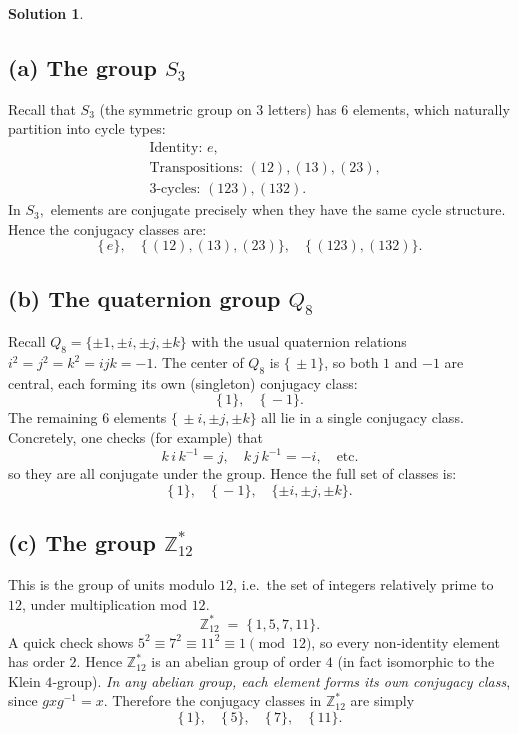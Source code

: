 \documentclass[12pt]{article}
\theoremstyle{definition} %
\newtheorem{solution}{Solution}
\theoremstyle{plain} %
\begin{document}
\begin{solution}
    \subsection*{(a) The group $S_3$}

Recall that $S_3$ (the symmetric group on 3 letters) has 6 elements, which naturally partition into cycle types:
\[
\begin{aligned}
&\text{Identity: } e,\\
&\text{Transpositions: } (12), (13), (23),\\
&\text{3-cycles: } (123), (132).
\end{aligned}
\]
In $S_3,$ elements are conjugate precisely when they have the same cycle structure.  Hence the conjugacy classes are:
\[
\{\,e\}, 
\quad
\{\,(12),(13),(23)\},
\quad
\{\,(123),(132)\}.
\]

\subsection*{(b) The quaternion group $Q_8$}

Recall $Q_8 = \{\pm 1,\pm i,\pm j,\pm k\}$ with the usual quaternion relations $i^2=j^2=k^2=ijk=-1$. The center of $Q_8$ is $\{\,\pm 1\}$, so both $1$ and $-1$ are central, each forming its own (singleton) conjugacy class:
\[
\{\,1\}, 
\quad
\{\,-1\}.
\]
The remaining 6 elements $\{\,\pm i,\pm j,\pm k\}$ all lie in a single conjugacy class.  Concretely, one checks (for example) that 
\[
k\,i\,k^{-1} = j,\quad k\,j\,k^{-1} = -i,\quad
\text{etc.}
\]
so they are all conjugate under the group.  Hence the full set of classes is:
\[
\{\,1\},\quad \{\,-1\}, \quad \{\pm i,\pm j,\pm k\}.
\]

\subsection*{(c) The group $\mathbb{Z}_{12}^*$}

This is the group of units modulo $12$, i.e.\ the set of integers relatively prime to $12$, under multiplication mod $12$.  
\[
\mathbb{Z}_{12}^* \;=\;\{\,1,5,7,11\}.
\]
A quick check shows $5^2 \equiv 7^2 \equiv 11^2 \equiv 1\pmod{12}$, so every non‐identity element has order $2.$ 
Hence $\mathbb{Z}_{12}^*$ is an abelian group of order $4$ (in fact isomorphic to the Klein $4$‐group).  
\emph{In any abelian group, each element forms its own conjugacy class}, since $g x g^{-1} = x$.  
Therefore the conjugacy classes in $\mathbb{Z}_{12}^*$ are simply
\[
\{\,1\},\quad \{\,5\},\quad \{\,7\},\quad \{\,11\}.
\]
\end{solution}
\end{document}
